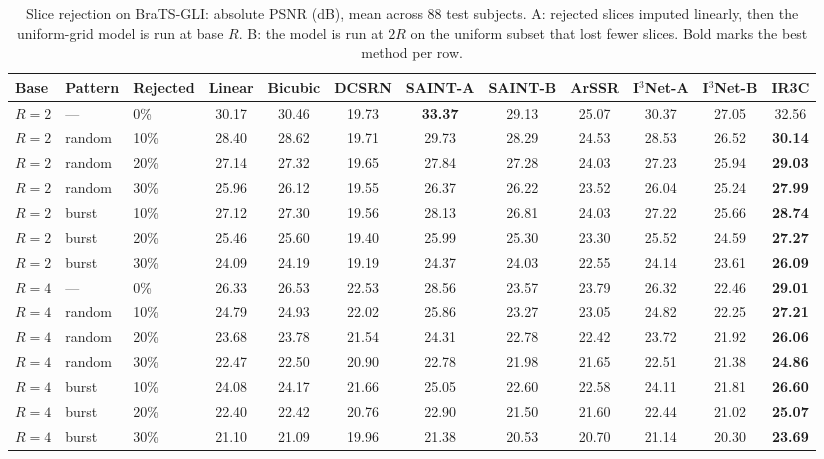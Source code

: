 \begin{table}[pos=!htbp]
\caption{Slice rejection on BraTS-GLI: absolute PSNR (dB), mean across 88 test subjects. A: rejected slices imputed linearly, then the uniform-grid model is run at base $R$. B: the model is run at $2R$ on the uniform subset that lost fewer slices. Bold marks the best method per row.}
\label{tab:reject-abs-brats}
\footnotesize
\begin{tabular*}{\textwidth}{@{\extracolsep{\fill}}lllccccccccc@{}}
\toprule
Base & Pattern & Rejected & Linear & Bicubic & DCSRN & SAINT-A & SAINT-B & ArSSR & I$^3$Net-A & I$^3$Net-B & IR3C \\
\midrule
$R=2$ & --- & 0\% & 30.17 & 30.46 & 19.73 & \textbf{33.37} & 29.13 & 25.07 & 30.37 & 27.05 & 32.56 \\
$R=2$ & random & 10\% & 28.40 & 28.62 & 19.71 & 29.73 & 28.29 & 24.53 & 28.53 & 26.52 & \textbf{30.14} \\
$R=2$ & random & 20\% & 27.14 & 27.32 & 19.65 & 27.84 & 27.28 & 24.03 & 27.23 & 25.94 & \textbf{29.03} \\
$R=2$ & random & 30\% & 25.96 & 26.12 & 19.55 & 26.37 & 26.22 & 23.52 & 26.04 & 25.24 & \textbf{27.99} \\
$R=2$ & burst & 10\% & 27.12 & 27.30 & 19.56 & 28.13 & 26.81 & 24.03 & 27.22 & 25.66 & \textbf{28.74} \\
$R=2$ & burst & 20\% & 25.46 & 25.60 & 19.40 & 25.99 & 25.30 & 23.30 & 25.52 & 24.59 & \textbf{27.27} \\
$R=2$ & burst & 30\% & 24.09 & 24.19 & 19.19 & 24.37 & 24.03 & 22.55 & 24.14 & 23.61 & \textbf{26.09} \\
$R=4$ & --- & 0\% & 26.33 & 26.53 & 22.53 & 28.56 & 23.57 & 23.79 & 26.32 & 22.46 & \textbf{29.01} \\
$R=4$ & random & 10\% & 24.79 & 24.93 & 22.02 & 25.86 & 23.27 & 23.05 & 24.82 & 22.25 & \textbf{27.21} \\
$R=4$ & random & 20\% & 23.68 & 23.78 & 21.54 & 24.31 & 22.78 & 22.42 & 23.72 & 21.92 & \textbf{26.06} \\
$R=4$ & random & 30\% & 22.47 & 22.50 & 20.90 & 22.78 & 21.98 & 21.65 & 22.51 & 21.38 & \textbf{24.86} \\
$R=4$ & burst & 10\% & 24.08 & 24.17 & 21.66 & 25.05 & 22.60 & 22.58 & 24.11 & 21.81 & \textbf{26.60} \\
$R=4$ & burst & 20\% & 22.40 & 22.42 & 20.76 & 22.90 & 21.50 & 21.60 & 22.44 & 21.02 & \textbf{25.07} \\
$R=4$ & burst & 30\% & 21.10 & 21.09 & 19.96 & 21.38 & 20.53 & 20.70 & 21.14 & 20.30 & \textbf{23.69} \\
\bottomrule
\end{tabular*}
\end{table}

